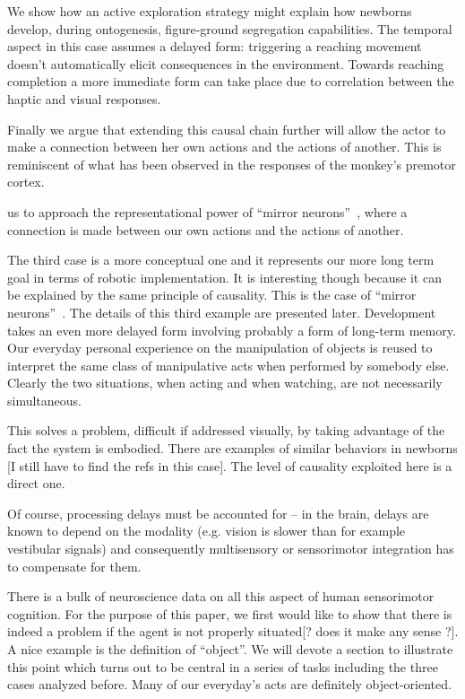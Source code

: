 We
show how an active exploration strategy might explain how newborns
develop, during ontogenesis, figure-ground segregation capabilities.
The temporal aspect in this case assumes a delayed form: triggering a
reaching movement doesn't automatically elicit consequences in the
environment. Towards reaching completion a more immediate form can
take place due to correlation between the haptic and visual responses.
\fi


Finally we argue that extending this causal chain further will allow
the actor to make a connection between her own actions and the actions 
of another. This is reminiscent of what has been observed in the responses
of the monkey's premotor cortex. 

\ifverbose
us to approach the representational power of ``mirror
neurons''~\cite{fadiga00visuomotor}, where a connection is made
between our own actions and the actions of another.
\fi

\ifverbose
The third case is a more conceptual one and it represents our more long
term goal in terms of robotic implementation. It is interesting though
because it can be explained by the same principle of causality. This
is the case of ``mirror neurons''~\cite{fadiga00visuomotor}. The
details of this third example are presented later.  Development takes
an even more delayed form involving probably a form of long-term
memory. Our everyday personal experience on the manipulation of objects is
reused to interpret the same class of manipulative acts when performed
by somebody else.  Clearly the two situations, when acting and when watching,
 are not necessarily simultaneous.
\fi

\ifverbose
This solves a problem,
difficult if addressed visually, by taking advantage of the fact the
system is embodied.  There are examples of similar behaviors in
newborns [I still have to find the refs in this case]. The level of
causality exploited here is a direct one. 
\fi

\ifverbose
  Of
course, processing delays must be accounted for -- in the brain,
delays are known to depend on the modality (e.g. vision is slower than
for example vestibular signals) and consequently multisensory or
sensorimotor integration has to compensate for them.
\fi



\ifverbose
There is a bulk of neuroscience data on all this aspect of human
sensorimotor cognition. For the purpose of this paper, we first would
like to show that there is indeed a problem if the agent is not
properly situated[? does it make any sense ?]. A nice example is the
definition of ``object''.  We will devote a
section to illustrate this point which turns out to be central in a
series of tasks including the three cases analyzed before. Many of our everyday's
acts are definitely object-oriented.

